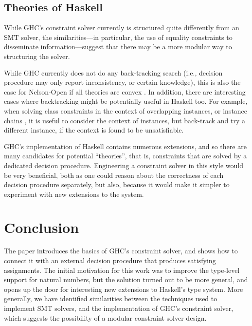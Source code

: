\documentclass{sigplanconf}
\begin{document}
\subsection{Theories of Haskell}

While GHC's constraint solver currently is structured quite differently
from an SMT solver, the similarities---in particular, the use of equality
constraints to disseminate information---suggest that there may be
a more modular way to structuring the solver.

While GHC currently does not do any back-tracking search (i.e., decision
procedure may only report inconsistency, or certain knowledge), this
is also the case for Nelson-Open if all theories are convex \cite{NelsonOppen}.
In addition,
there are interesting cases where backtracking might be potentially useful
in Haskell too.  For example, when solving class constraints in the
context of overlapping instances, or instance chains \cite{instance-chains},
it is useful to consider the context of instances,
but back-track and try a different instance, if the context is found
to be unsatisfiable.

GHC's implementation of Haskell contains numerous extensions, and so
there are many candidates for potential ``theories'', that is, constraints
that are solved by a dedicated decision procedure.  Engineering a
constraint solver in this style would be very beneficial, both
as one could reason about the correctness of each decision procedure
separately, but also, because it would make it simpler to experiment
with new extensions to the system.

\section {Conclusion}

The paper introduces the basics of GHC's constraint solver, and shows
how to connect it with an external decision procedure that produces
satisfying assignments.  The initial motivation for this work was
to improve the type-level support for natural numbers, but the solution
turned out to be more general, and opens up the door for interesting
new extensions to Haskell's type system.  More generally, we have
identified similarities between the techniques used to implement SMT solvers,
and the implementation of GHC's constraint solver, which suggests
the possibility of a modular constraint solver design.
\end{document}
